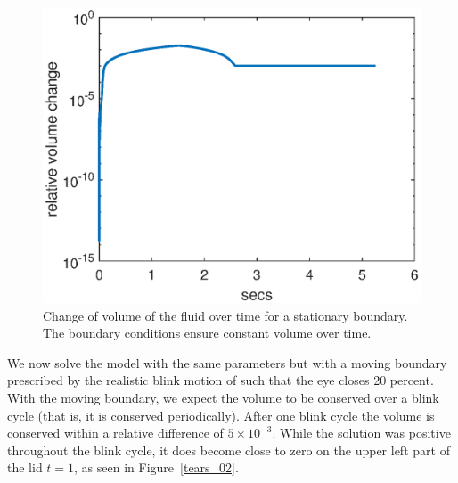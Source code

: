 \begin{figure}
	\centering
	\includegraphics[scale=0.8]{Chapter4/stationary_volume_change}
	\caption{Change of volume of the fluid over time for a stationary boundary. The boundary conditions ensure constant volume over time.}
	\label{eye_volume}
\end{figure}

We now solve the model with the same parameters but with a moving boundary prescribed by the realistic blink motion of \cite{deng2014heat} such that the eye closes 20 percent. With the moving boundary, we expect the volume to be conserved over a blink cycle (that is, it is conserved periodically). After one blink cycle the volume is conserved within a relative difference of $5 \times 10^{-3}$. While the solution was positive throughout the blink cycle, it does become close to zero on the upper left part of the lid $t=1$, as seen in Figure~\ref{tears_02}.


